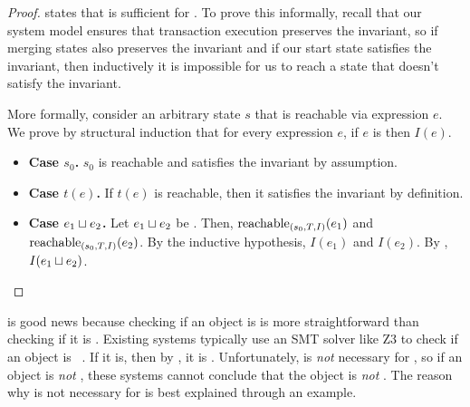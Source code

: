 \begin{proof}
 states that \invariantclosure{} is
sufficient for \invariantconfluence{}. To prove this informally, recall that
our system model ensures that transaction execution preserves the invariant, so
if merging states also preserves the invariant and if our start state satisfies
the invariant, then inductively it is impossible for us to reach a state that
doesn't satisfy the invariant.

More formally, consider an arbitrary state $s$ that is reachable via expression
$e$. We prove by structural induction that for every expression $e$, if $e$ is
\sTIreachable{} then $I(e)$.
\begin{itemize}
  \item \textbf{Case $s_0$.}
    $s_0$ is reachable and satisfies the invariant by assumption.

  \item \textbf{Case $t(e)$.}
    If $t(e)$ is reachable, then it satisfies the invariant by definition.

  \item \textbf{Case $e_1 \sqcup e_2$.}
    Let $e_1 \sqcup e_2$ be \sTIreachable{}. Then, $\text{reachable}_{(s_0, T, I)}(e_1)$
    and $\text{reachable}_{(s_0, T, I)}(e_2)$. By the inductive hypothesis, $I(e_1)$
    and $I(e_2)$. By \invariantclosure{}, $I(e_1 \sqcup e_2)$.
\end{itemize}
\end{proof}

 is good news because checking if an object
is \invariantclosed{} is more straightforward than checking if it is
\invariantconfluent{}. Existing systems typically use an SMT solver like Z3 to
check if an object is \invariantclosed{}~\cite{de2008z3, balegas2015putting,
gotsman2016cause}. If it is, then by , it is
\invariantconfluent{}.  Unfortunately, \invariantclosure{} is \emph{not}
necessary for \invariantconfluence{}, so if an object is \emph{not}
\invariantclosed{}, these systems cannot conclude that the object is \emph{not}
\invariantconfluent{}. The reason why \invariantclosure{} is not necessary for
\invariantconfluence{} is best explained through an example.

{}

